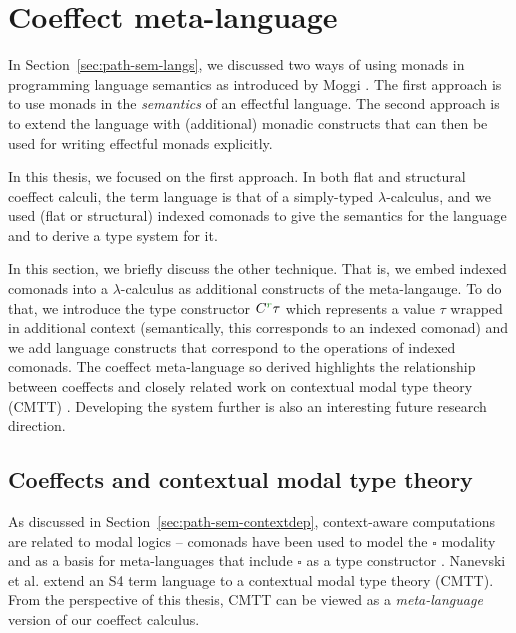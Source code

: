 \section{Coeffect meta-language}
\label{sec:further-meta}

In Section~\ref{sec:path-sem-langs}, we discussed two ways of using monads in programming
language semantics as introduced by Moggi \cite{monad-notions}. The first approach is to use
monads in the \emph{semantics} of an effectful language. The second approach is to extend the
language with (additional) monadic constructs that can then be used for writing effectful
monads explicitly.

In this thesis, we focused on the first approach. In both flat and structural coeffect calculi,
the term language is that of a simply-typed $\lambda$-calculus, and we used (flat or structural)
indexed comonads to give the semantics for the language and to derive a type system for it.

In this section, we briefly discuss the other technique. That is, we embed indexed comonads into
a $\lambda$-calculus as additional constructs of the meta-langauge. To do that, we introduce the
type constructor $\ctyp{\cclrd{r}}{\tau}$ which represents a value $\tau$ wrapped in additional
context (semantically, this corresponds to an indexed comonad) and we add language constructs
that correspond to the operations of indexed comonads. The coeffect meta-language so derived highlights
the relationship between coeffects and closely related work on contextual modal type theory (CMTT)
\cite{logic-cmtt}. Developing the system further is also an interesting future research direction.


\subsection{Coeffects and contextual modal type theory}

As discussed in Section~\ref{sec:path-sem-contextdep}, context-aware computations are related
to modal logics -- comonads have been used to model the $\square$ modality and as a basis for
meta-languages that include $\square$ as a type constructor
\cite{logic-intuitionistic-modal,logic-modal-reconstruction,logic-intuitionistic-modal,logic-cmtt}.
Nanevski et al. \cite{logic-cmtt} extend an S4 term language to a contextual modal type theory (CMTT).
From the perspective of this thesis, CMTT can be viewed as a \emph{meta-language} version of our
coeffect calculus.

